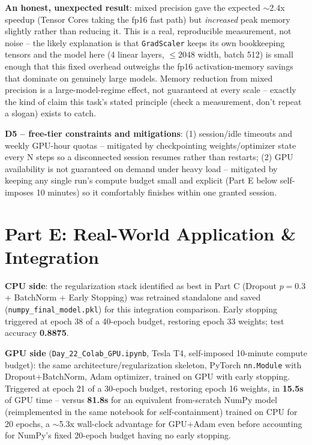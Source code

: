 \documentclass[11pt,a4paper]{article}
\begin{document}
\textbf{An honest, unexpected result}: mixed precision gave the expected $\sim$2.4x speedup
(Tensor Cores taking the fp16 fast path) but \emph{increased} peak memory slightly rather than
reducing it. This is a real, reproducible measurement, not noise -- the likely explanation is
that \texttt{GradScaler} keeps its own bookkeeping tensors and the model here (4 linear layers,
$\leq 2048$ width, batch 512) is small enough that this fixed overhead outweighs the fp16
activation-memory savings that dominate on genuinely large models. Memory reduction from mixed
precision is a large-model-regime effect, not guaranteed at every scale -- exactly the kind of
claim this task's stated principle (check a measurement, don't repeat a slogan) exists to catch.

\textbf{D5 -- free-tier constraints and mitigations}: (1) session/idle timeouts and weekly GPU-hour
quotas -- mitigated by checkpointing weights/optimizer state every N steps so a disconnected
session resumes rather than restarts; (2) GPU availability is not guaranteed on demand under
heavy load -- mitigated by keeping any single run's compute budget small and explicit (Part E
below self-imposes 10 minutes) so it comfortably finishes within one granted session.

\section*{Part E: Real-World Application \& Integration}

\textbf{CPU side}: the regularization stack identified as best in Part C (Dropout $p{=}0.3$ +
BatchNorm + Early Stopping) was retrained standalone and saved (\texttt{numpy\_final\_model.pkl})
for this integration comparison. Early stopping triggered at epoch 38 of a 40-epoch budget,
restoring epoch 33 weights; test accuracy \textbf{0.8875}.

\textbf{GPU side} (\texttt{Day\_22\_Colab\_GPU.ipynb}, Tesla T4, self-imposed 10-minute compute
budget): the same architecture/regularization skeleton, PyTorch \texttt{nn.Module} with
Dropout+BatchNorm, Adam optimizer, trained on GPU with early stopping. Triggered at epoch 21 of
a 30-epoch budget, restoring epoch 16 weights, in \textbf{15.5s} of GPU time -- versus \textbf{81.8s}
for an equivalent from-scratch NumPy model (reimplemented in the same notebook for
self-containment) trained on CPU for 20 epochs, a $\sim$5.3x wall-clock advantage for GPU+Adam
even before accounting for NumPy's fixed 20-epoch budget having no early stopping.
\end{document}
